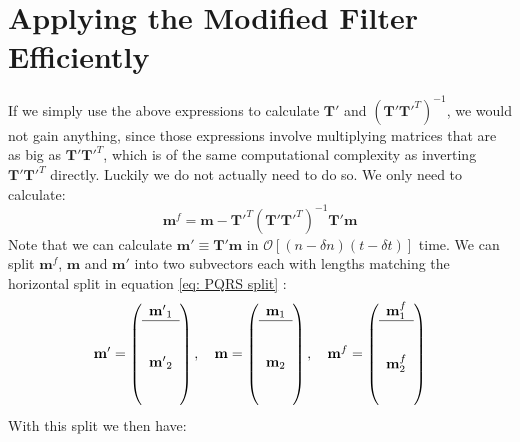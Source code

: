 \documentclass{article}
\begin{document}
\section{Applying the Modified Filter Efficiently}
If we simply use the above expressions to calculate $\mathbf{T'}$ and 
$\left(\mathbf{T'T'}^T\right)^{-1}$, we would not gain anything, since those
expressions involve multiplying matrices that are as big as
$\mathbf{T'T'}^T$, which is of the same computational complexity as inverting
$\mathbf{T'T'}^T$ directly. Luckily we do not actually need to do so. We only
need to calculate:
\begin{equation}
	\mathbf{m}^f=\mathbf{m}-\mathbf{T'}^T\left(\mathbf{T'T'}^T\right)^{-1}
	\mathbf{T'm}
\end{equation}
Note that we can calculate $\mathbf{m'}\equiv\mathbf{T'm}$ in
$\mathcal{O}\left[(n-\delta n)(t-\delta t)\right]$ time. 
We can split $\mathbf{m}^f$, $\mathbf{m}$ and $\mathbf{m'}$ into two 
subvectors each with lengths matching the horizontal split in equation 
\ref{eq: PQRS split} : 
\begin{equation}
	\mathbf{m'}=\left(\begin{array}{c}
		\mathbf{m'}_1\\ \hline\\ {}\\ \mathbf{m'}_2\\ {}\\ {}
	\end{array} \right),\quad 
	\mathbf{m}=\left(\begin{array}{c}
		\mathbf{m}_1\\ \hline\\ {}\\ \mathbf{m}_2\\ {}\\ {}
	\end{array}
	\right),\quad 
	\mathbf{m}^f=\left(\begin{array}{c}
		\mathbf{m}^f_1\\ \hline\\ {}\\ \mathbf{m}^f_2\\ {}\\ {}
	\end{array} \right)
\end{equation}
With this split we then have:
\end{document}

